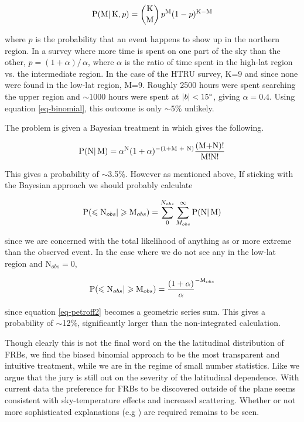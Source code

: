 \documentclass[useAMS,usenatbib]{mn2e}
\begin{document}
\begin{equation}
\label{eq-binomial}
\textup{P(M} | \,\textup{K}, p) =  \binom{\textup{K}}{\textup{M}} \, p^{\textup{M}} (1-p)^{\textup{K}-\textup{M}} 
\end{equation}

\noindent where $p$ is the probability that an event happens to show up in the 
northern region. In a survey where more time is spent on one part of the 
sky than the other, $p=(1 + \alpha)/\, \alpha$, where $\alpha$ is the ratio of 
time spent in the high-lat region vs. the intermediate region. In the case of the HTRU 
survey, K=9 and since none were found 
in the low-lat region, M=9. Roughly 2500 hours were spent searching the upper region
and $\sim1000$ hours were spent at $|b| < 15\degree$, giving $\alpha=0.4$. Using equation 
\ref{eq-binomial}, this outcome is only $\sim5\%$ unlikely. 

The problem is given a Bayesian treatment in 
\cite{2014ApJ...789L..26P} which gives the following.

\begin{equation}
\label{eq-petroff}
\textup{P(N} | \,\textup{M}) =  \alpha^{\textup{N}} (1 + \alpha)^{-(1 + \textup{M + N})} \frac{(\textup{M+N})!}{\textup{M!N!}}
\end{equation}

\noindent This gives a probability of $\sim$3.5$\%$. However as mentioned 
above, If sticking with the Bayesian 
approach we should probably calculate

\begin{equation} 
\label{eq-petroff2}
\textup{P}(\le \textup{N}_{obs} | \ge \textup{M}_{obs}) = \sum_{0}^{N_{obs}} \sum_{M_{obs}}^\infty \textup{P(N} | \,\textup{M})
\end{equation} 

\noindent since we are concerned with the total likelihood of anything as or more 
extreme than the observed event. In the case where we do not see any in the low-lat 
region and N$_{obs}=0$, 

\begin{equation}
\textup{P}(\le \textup{N}_{obs} | \ge \textup{M}_{obs})=\frac{(1+\alpha)}{\alpha}^{-\textup{M}_{obs}}
\end{equation}

\noindent since equation \ref{eq-petroff2} becomes a geometric series sum. 
This gives a probability of $\sim$12$\%$, significantly larger than the non-integrated
calculation. 

Though clearly this is not the final word on the the latitudinal distribution of FRBs, 
we find the biased binomial approach to be the 
most transparent and intuitive treatment, while we are in the regime of small number statistics. 
Like \cite{2015arXiv150500834R} we argue
that the jury is still out on the severity of the latitudinal 
dependence. With current data the preference for FRBs to 
be discovered outside of the plane seems consistent with
sky-temperature effects and increased scattering. 
Whether or not more sophisticated explanations 
(e.g \cite{2015MNRAS.451.3278M}) are required remains to be seen. 
\end{document}
